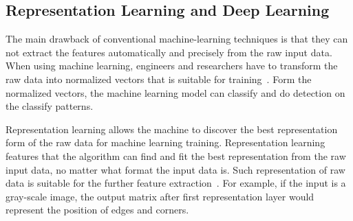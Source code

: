 \begin{spacing}{1.5}
\subsection{Representation Learning and Deep Learning}

The main drawback of conventional machine-learning techniques is that they can not extract the features automatically and precisely from the raw input data. When using machine learning, engineers and researchers have to transform the raw data into normalized vectors that is suitable for training~\cite{ongsulee2017artificial}. Form the normalized vectors, the machine learning model can classify and do detection on the classify patterns.

Representation learning allows the machine to discover the best representation form of the raw data for machine learning training. Representation learning features that the algorithm can find and fit the best representation from the raw input data, no matter what format the input data is. Such representation of raw data is suitable for the further feature extraction~\cite{bengio2013representation}. For example, if the input is a gray-scale image, the output matrix after first representation layer would represent the position of edges and corners.


\end{spacing}
